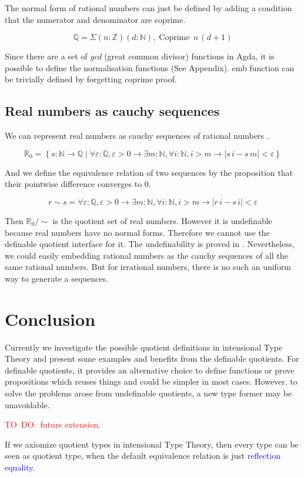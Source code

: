 \documentclass[envcountsame]{llncs}
\newcommand{\todo}[1]{\textcolor{red}{TO~DO:~#1}}
\newcommand{\ed}[1]{\textcolor{blue}{#1}}
\newcommand{\N}{\mathbb{N}}
\newcommand{\Q}{\mathbb{Q}}
\newcommand{\R}{\mathbb{R}}
\newcommand{\Z}{\mathbb{Z}}
\providecommand{\set}  [1]{\left\{#1\right\}}
\DeclareMathOperator{\coprime}{Coprime}
\newcommand{\itt}{intensional Type Theory}
\begin{document}
The normal form of rational numbers can just be defined by adding a condition that the numerator and denominator are coprime.

$$\Q = \Sigma (n \colon \Z)(d \colon \N), \coprime \,n \,(d +1)$$

Since there are a set of \emph{gcd} (great common divisor) functions in Agda, it is possible to define the normalisation functions (See Appendix).
emb function can be trivially defined by forgetting coprime proof.

\subsection{Real numbers as cauchy sequences}

We can represent real numbers as cauchy sequences of rational numbers \cite{bis:85}.

$$\R_{0} = \set{s : \N\to\Q \mid \forall\varepsilon :\Q,\varepsilon>0\to\exists m:\N, \forall i:\N, i>m\to |s\,i - s\, m|<\varepsilon}$$

And we define the equivalence relation of two sequences by the proposition that their pointwise difference converges to 0.

$$r \sim s = \forall\varepsilon :\Q,\varepsilon>0\to\exists m:\N, \forall i:\N, i>m\to |r\,i - s\,i|<\varepsilon$$

Then $\R_0 /\sim$ is the quotient set of real numbers. However it is undefinable because real numbers have no normal forms.
Therefore we cannot use the definable quotient interface for it. The undefinability is proved in \cite{aan}.
Nevertheless, we could easily embedding rational numbers as the cauchy sequences of all the same rational numbers. But for irrational numbers, there is no such an uniform way to generate a sequences.
\section{Conclusion}

Currently we investigate the possible quotient definitions in \itt{} and present some examples and benefits from the definable quotients. For definable quotients, it provides an alternative choice to define functions or prove propositions which reuses things and could be simpler in most cases. However, to solve the problems arose from undefinable quotients, a new type former may be unavoidable.

\todo{future extension.}

% 

If we axiomize quotient types in \itt, then every type can be seen as quotient type, when the default equivalence relation is just \ed{reflection equality}.
\newpage


\end{document}
